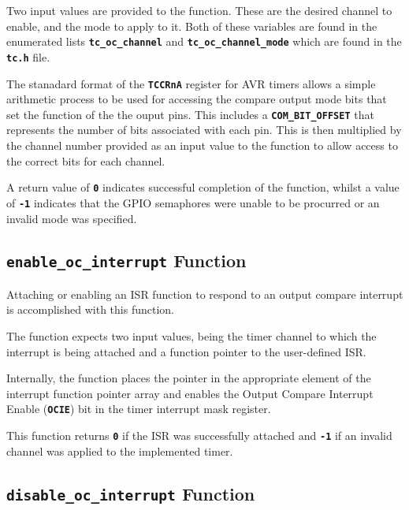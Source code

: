 \documentclass[a4paper, oneside, 11pt, titlepage, onecolumn, openright]{report}
\begin{document}
			Two input values are provided to the function. These are the desired channel to enable, and the mode to apply to it. Both of these variables are found in the enumerated lists \textbf{\texttt{tc\_oc\_channel}} and \textbf{\texttt{tc\_oc\_channel\_mode}} which are found in the \textbf{\texttt{tc.h}} file.
			
			The stanadard format of the \textbf{\texttt{TCCRnA}} register for AVR timers allows a simple arithmetic process to be used for accessing the compare output mode bits that set the function of the the ouput pins. This includes a \textbf{\texttt{COM\_BIT\_OFFSET}} that represents the number of bits associated with each pin. This is then multiplied by the channel number provided as an input value to the function to allow access to the correct bits for each channel.
			
			A return value of \textbf{\texttt{0}} indicates successful completion of the function, whilst a value of \textbf{\texttt{-1}} indicates that the GPIO semaphores were unable to be procurred or an invalid mode was specified.
			
\subsection{\textbf{\texttt{enable\_oc\_interrupt}} Function}
			\label{ss:HALtcenable_oc_interruptFunction}
			
			Attaching or enabling an ISR function to respond to an output compare interrupt is accomplished with this function.
			
			The function expects two input values, being the timer channel to which the interrupt is being attached and a function pointer to the user-defined ISR.
			
			Internally, the function places the pointer in the appropriate element of the interrupt function pointer array and enables the Output Compare Interrupt Enable (\textbf{\texttt{OCIE}}) bit in the timer interrupt mask register.
			
			This function returns \textbf{\texttt{0}} if the ISR was successfully attached and \textbf{\texttt{-1}} if an invalid channel was applied to the implemented timer.
			
\subsection{\textbf{\texttt{disable\_oc\_interrupt}} Function}
			\label{ss:HALtcdisable_oc_interruptFunction}
			
\end{document}
